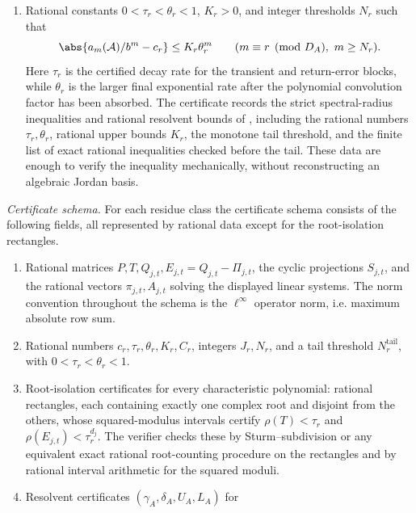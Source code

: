 \begin{theorem}
\begin{enumerate}[label=\textup{(\alph*)}]
\[    \]
    Again all cyclic indices are read modulo \(d_j\). This formula
    decides \(c_r=0\) or \(c_r>0\) by exact rational arithmetic.
    \item Rational constants \(0<\tau_r<\theta_r<1\), \(K_r>0\), and
    integer thresholds \(N_r\) such that
    \[
      \abs{a_m(\mathcal A)/b^m-c_r}\le K_r\theta_r^m
      \qquad(m\equiv r\pmod {D_A},\ m\ge N_r).
    \]
    Here \(\tau_r\) is the certified decay rate for the transient and
    return-error blocks, while \(\theta_r\) is the larger final
    exponential rate after the polynomial convolution factor has been
    absorbed. The certificate records the strict spectral-radius
    inequalities and rational resolvent bounds of
    , including the rational
    numbers \(\tau_r,\theta_r\), rational upper bounds \(K_r\), the
    monotone tail threshold, and the finite list of exact rational
    inequalities checked before the tail. These data are enough to
    verify the inequality mechanically, without reconstructing an
    algebraic Jordan basis.
  \end{enumerate}
  \smallskip
  \noindent\textit{Certificate schema.}
  For each residue class the certificate schema consists of the
  following fields, all represented by rational data except for the
  root-isolation rectangles.
  \begin{enumerate}[label=\textup{(\roman*)}]
    \item Rational matrices \(P,T,Q_{j,t},E_{j,t}=Q_{j,t}-\Pi_{j,t}\),
    the cyclic projections \(S_{j,t}\), and the rational vectors
    \(\pi_{j,t},A_{j,t}\) solving the displayed linear systems.
    The norm convention throughout the schema is the
    \(\ell^\infty\) operator norm, i.e. maximum absolute row sum.
    \item Rational numbers \(c_r,\tau_r,\theta_r,K_r,C_r\), integers
    \(J_r,N_r\), and a tail threshold \(N_r^{\mathrm{tail}}\), with
    \(0<\tau_r<\theta_r<1\).
    \item Root-isolation certificates for every characteristic
    polynomial: rational rectangles, each containing exactly one complex
    root and disjoint from the others, whose squared-modulus intervals
    certify \(\rho(T)<\tau_r\) and
    \(\rho(E_{j,t})<\tau_r^{d_j}\). The verifier checks these by
    Sturm--subdivision or any equivalent exact rational root-counting
    procedure on the rectangles and by rational interval arithmetic for
    the squared moduli.
    \item Resolvent certificates
    \((\gamma_A,\delta_A,U_A,L_A)\) for

\end{enumerate}
\end{theorem}
